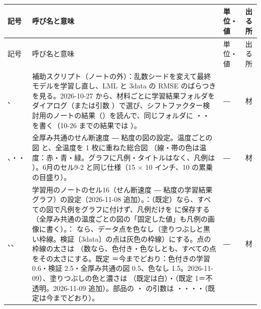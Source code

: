 \documentclass[paper=a4paper,fontsize=10.5pt,line_length=44zw,number_of_lines=38]{jlreq}
\makeatletter
\newcommand{\file}[1]{\texttt{\detokenize{#1}}}
\newenvironment{symtab}{%
  \begin{longtable}{@{}>{\raggedright\arraybackslash}p{6.5\zw}>{\raggedright\arraybackslash}p{22\zw}>{\raggedright\arraybackslash}p{6\zw}>{\raggedright\arraybackslash}p{4.5\zw}@{}}
  \toprule 記号 & 呼び名と意味 & 単位・値 & 出る所 \\ \midrule \endfirsthead
  \toprule 記号 & 呼び名と意味 & 単位・値 & 出る所 \\ \midrule \endhead
  \bottomrule \endlastfoot}{\end{longtable}}
\makeatother
\begin{document}
\begin{symtab}
\file{mat_seed_check.py}、\file{乱数シードの確認.csv} & 補助スクリプト（ノートの外）：乱数シードを変えて最終モデルを学習し直し、LML と 3data の RMSE のばらつきを見る。2026-10-27 から、材料ごとに学習結果フォルダをダイアログ（または引数 \file{PP=<フォルダ>}）で選び、シフトファクター検討用のノートの結果（\file{シフトファクターの検討/}）を読んで、同じフォルダに \file{乱数シードの確認.csv}・\file{…_まとめ.csv}・\file{乱数シードの確認.png} を書く（10-26 までの結果では \file{<入力>/比較/}）。 & ― & 材 \\
\file{FLOW_COMMON}、\file{FLOW_COMMON_XLIM}・\file{YLIM}・\file{NCOL} & 全厚み共通のせん断速度 ― 粘度の図の設定。温度ごとの図 \file{…_全厚み共通_<温度>C.png} と、全温度を 1 枚に重ねた総合図 \file{…_全厚み共通_全温度.png}（線・帯の色は温度：赤・青・緑。グラフに凡例・タイトルはなく、凡例は \file{…_凡例.png}）。6月のセル9-2 と同じ仕様（15 $\times$ 10 インチ、10 の累乗の目盛り）。 & ― & 材 \\
\file{FLOW_LEGEND_SEPARATE}、\file{FLOW_POINT_COLOR}、\file{FLOW_POINT_EDGE} & 学習用のノートのセル16（せん断速度 ― 粘度の学習結果グラフ）の設定（2026-11-08 追加）。\file{FLOW_LEGEND_SEPARATE}：\file{True}（既定）なら、すべての図で凡例をグラフに付けず、凡例だけを \file{<図の名前>_凡例.png} に保存する（全厚み共通の温度ごとの図の「固定した値」も凡例の画像に書く）。\file{FLOW_POINT_COLOR}：\file{False} なら、データ点を色なし（塗りつぶしと黒い枠線。検証〔3data〕の点は灰色の枠線）にする。点の枠線の太さは \file{FLOW_POINT_EDGE}（数なら、色付き・色なしとも、すべての点をその太さにする。既定 \file{None}＝今までどおり：色付きの学習 0.6・検証 2.5・全厚み共通の図 0.5、色なし 1.5。2026-11-09）、塗りつぶしの色と濃さは \file{FLOW_POINT_FILL}（既定は白）・\file{FLOW_POINT_FILL_ALPHA}（既定 1＝不透明。2026-11-09 追加）。部品の \file{flow_plot}・\file{flow_plot_common} の引数は \file{legend_separate}・\file{point_color}・\file{point_edge}・\file{point_fill}・\file{point_fill_alpha}（既定は今までどおり）。 & ― & 材 \\

\end{symtab}
\end{document}
